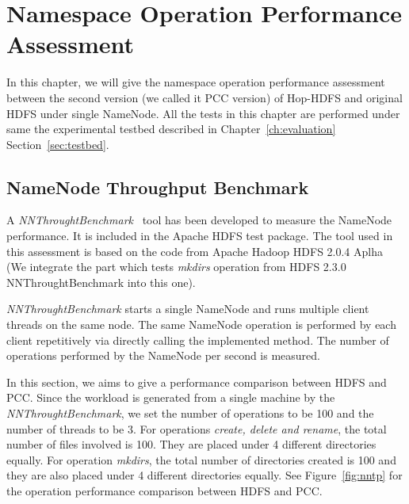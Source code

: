 
%
%
%


\chapter{Namespace Operation Performance Assessment}
\label{ch:Assessment}

 In this chapter, we will give the namespace operation performance assessment between the second version (we called it PCC version) of Hop-HDFS and original HDFS under single NameNode. All the tests in this chapter are performed under same the experimental testbed described in Chapter~\ref{ch:evaluation} Section~\ref{sec:testbed}.

\section{NameNode Throughput Benchmark}

A \textit{NNThroughtBenchmark}~\cite{shvachko2010hdfs} tool has been developed to measure the NameNode performance. It is included in the Apache HDFS test package. The tool used in this assessment is based on the code from Apache Hadoop HDFS 2.0.4 Aplha (We integrate the part which tests \textit{mkdirs} operation from HDFS 2.3.0 NNThroughtBenchmark into this one).

\noindent \textit{NNThroughtBenchmark} starts a single NameNode and runs multiple client threads on the same node.  The same NameNode operation is performed by each client repetitively via directly calling the implemented method. The number of operations performed by the NameNode per second is measured.

\noindent In this section, we aims to give a performance comparison between HDFS and PCC. Since the workload is generated from a single machine by the \textit{NNThroughtBenchmark}, we set the number of operations to be 100 and the number of threads to be 3. For operations \textit{create, delete and rename}, the total number of files involved is 100. They are placed under 4 different directories equally. For operation \textit{mkdirs}, the total number of directories created is 100 and they are also placed under 4 different directories equally. See Figure~\ref{fig:nntp} for the operation performance comparison between HDFS and PCC.

